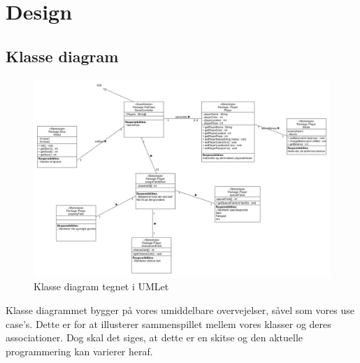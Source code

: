 \section{Design}

\subsection{Klasse diagram}
        \begin{figure}[h]
            \advance\leftskip-3cm
            \includegraphics[width=20cm]{fig/Designklassediagram(3).jpg}
            \caption{Klasse diagram tegnet i UMLet}
        \end{figure}
    Klasse diagrammet bygger på vores umiddelbare overvejelser, såvel som vores use case's.
    Dette er for at illusterer sammenspillet mellem vores klasser og deres associationer.
    Dog skal det siges, at dette er en skitse og den aktuelle programmering kan varierer heraf.



